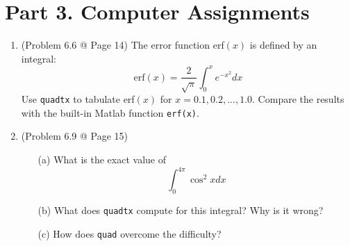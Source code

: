 \documentclass[10pt]{report}
\newcommand{\dintt}[4] {\int_{#1}^{#2} #3 d#4}
\begin{document}
\section*{Part 3. Computer Assignments}
\begin{enumerate}
	\item 
	(Problem 6.6 @ Page 14)  The error function erf$(x)$ is defined by an integral:
	\[
	\text{erf}(x) = \frac{2}{\sqrt{\pi}} \dintt{0}{x}{e^{-x^2}}{x}
	\]
	Use \texttt{quadtx} to tabulate erf$(x)$ for $x = 0.1, 0.2, . . . , 1.0$. Compare the results with the built-in Matlab function \texttt{erf(x)}.
	
	\item 
	(Problem 6.9 @ Page 15)
	\begin{enumerate}
		\item [(a)]
		What is the exact value of
		\[
		\dintt{0}{4\pi}{\cos^2 x}{x}
		\]
		
		\item [(b)]
		What does \texttt{quadtx} compute for this integral? Why is it wrong?
		
		\item [(c)]
		How does \texttt{quad} overcome the difficulty?
	\end{enumerate}
\end{enumerate}
\end{document}

